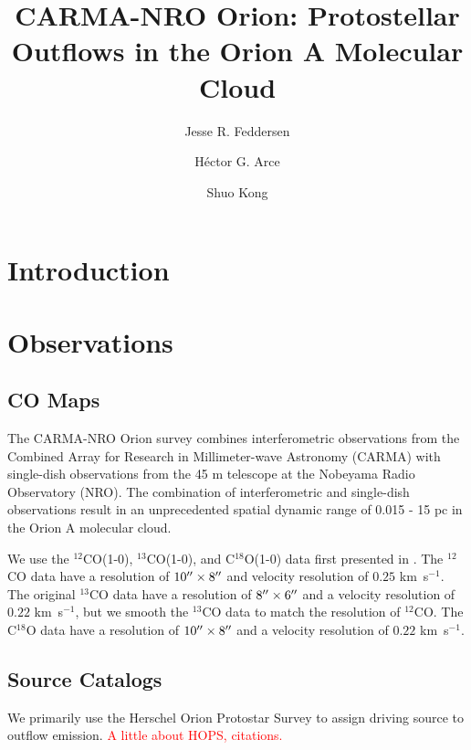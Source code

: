 \documentclass[twocolumn]{aastex62}
\newcommand{\kms}{km~s$^{-1}$}
\newcommand{\co}[1][]{\ensuremath{^{#1}}CO}
\begin{document}
\title{CARMA-NRO Orion: Protostellar Outflows in the Orion A Molecular Cloud}

\author{Jesse R. Feddersen}
\author{H\'ector G. Arce}
\author{Shuo Kong}


\begin{abstract}

\end{abstract}


\section{Introduction}



\section{Observations}

\subsection{CO Maps}
The CARMA-NRO Orion survey combines interferometric observations from the Combined Array for Research in Millimeter-wave Astronomy (CARMA) with single-dish observations from the 45 m telescope at the Nobeyama Radio Observatory (NRO). The combination of interferometric and single-dish observations result in an unprecedented spatial dynamic range of 0.015 - 15 pc in the Orion A molecular cloud.

We use the \co[12](1-0), \co[13](1-0), and C$^{18}$O(1-0) data first presented in \citet{Kong18}. The \co[12]{} data have a resolution of $10\mbox{$^{\prime\prime}$}\times8\mbox{$^{\prime\prime}$}$ and velocity resolution of $0.25$ \kms{}. The original \co[13] data have a resolution of $8\mbox{$^{\prime\prime}$}\times6\mbox{$^{\prime\prime}$}$ and a velocity resolution of $0.22$ \kms{}, but we smooth the \co[13]{} data to match the resolution of \co[12]{}. The C$^{18}$O data have a resolution of $10\mbox{$^{\prime\prime}$}\times8\mbox{$^{\prime\prime}$}$ and a velocity resolution of $0.22$ \kms{}.

\subsection{Source Catalogs}
We primarily use the Herschel Orion Protostar Survey \citep[HOPS;][]{Furlan16} to assign driving source to outflow emission. \textcolor{red}{A little about HOPS, citations.}
\end{document}
